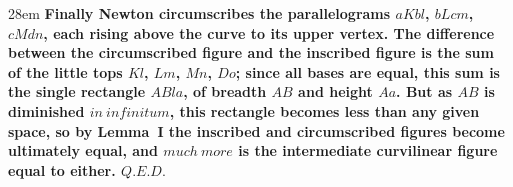 \documentclass[border=4pt]{standalone}
\begin{document}
\begin{varwidth}{28em}
\large\bfseries
Finally Newton circumscribes \textcolor{circ}{the parallelograms $aKbl$, $bLcm$, $cMdn$},
each rising above \textcolor{curve}{the curve} to its upper vertex.
The difference between \textcolor{circ}{the circumscribed figure} and the inscribed figure
is the sum of the little tops $Kl$, $Lm$, $Mn$, $Do$; since all bases are equal,
this sum is \textcolor{excess}{the single rectangle $ABla$}, of breadth $AB$ and height $Aa$.
But as $AB$ is diminished $in\ infinitum$, \textcolor{excess}{this rectangle} becomes less
than any given space, so by Lemma~I the inscribed and \textcolor{circ}{circumscribed} figures
become ultimately equal, and $much\ more$ is \textcolor{curve}{the intermediate curvilinear figure}
equal to either.
$Q.E.D.$
\end{varwidth}
\end{document}

